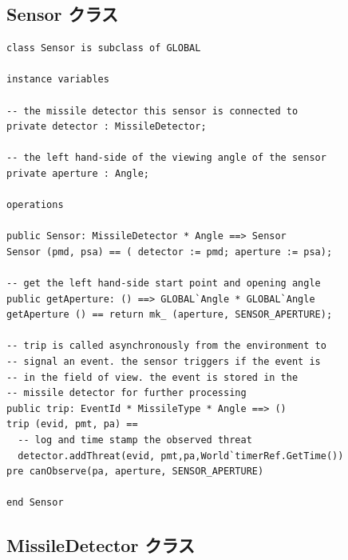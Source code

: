 \documentclass[\pformat,12pt]{jreport}
\begin{document}
\subsection{Sensor クラス}

\begin{lstlisting}
class Sensor is subclass of GLOBAL

instance variables

-- the missile detector this sensor is connected to
private detector : MissileDetector;

-- the left hand-side of the viewing angle of the sensor
private aperture : Angle;

operations

public Sensor: MissileDetector * Angle ==> Sensor
Sensor (pmd, psa) == ( detector := pmd; aperture := psa);

-- get the left hand-side start point and opening angle
public getAperture: () ==> GLOBAL`Angle * GLOBAL`Angle
getAperture () == return mk_ (aperture, SENSOR_APERTURE);

-- trip is called asynchronously from the environment to
-- signal an event. the sensor triggers if the event is
-- in the field of view. the event is stored in the
-- missile detector for further processing
public trip: EventId * MissileType * Angle ==> ()
trip (evid, pmt, pa) ==
  -- log and time stamp the observed threat
  detector.addThreat(evid, pmt,pa,World`timerRef.GetTime())
pre canObserve(pa, aperture, SENSOR_APERTURE)

end Sensor
\end{lstlisting}

\subsection{MissileDetector クラス}
\end{document}
